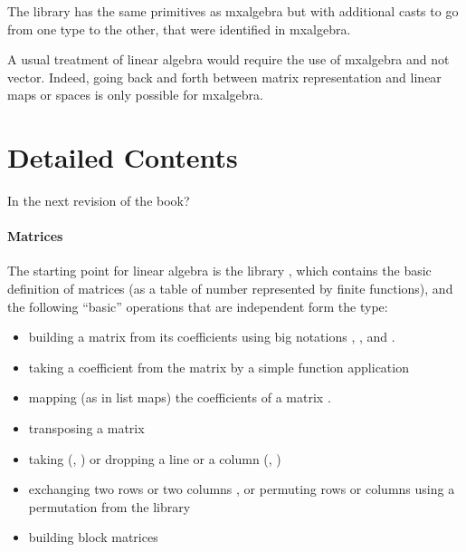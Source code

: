 The library  has the same primitives as mxalgebra
but with additional casts to go from one type to the other, that were
identified in mxalgebra.

A usual treatment of linear algebra would require the use of mxalgebra
and not vector. Indeed, going back and forth between matrix
representation and linear maps or spaces is only possible for
mxalgebra.



\newcommand{\idmat}{\ensuremath{\mathbb{I}}}

\section{Detailed Contents}
In the next revision of the book?

\paragraph{Matrices}

The starting point for linear algebra is the library
, which contains the basic definition of matrices
(as a table of number represented by finite functions), and the
following ``basic'' operations that are independent form the type:
\begin{itemize}
\item building a matrix from its coefficients using big notations
  , ,  and .
\item taking a coefficient from the matrix by a simple function
  application 
\item mapping (as in list maps) the coefficients of a matrix
  .
\item transposing a matrix 
\item taking (, ) or dropping a line or a column
  (, )
\item exchanging two rows  or two columns , or
  permuting rows  or columns  using a
  permutation from the library 
\item building block matrices
\end{itemize}

